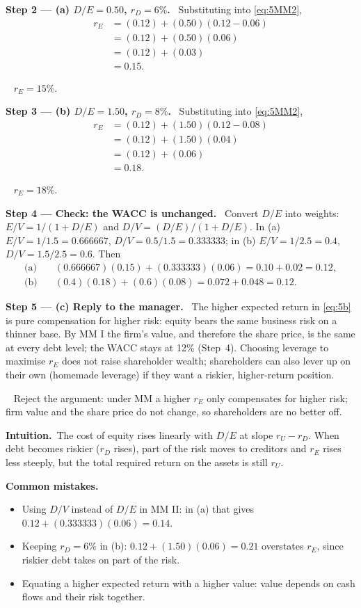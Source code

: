 \documentclass[11pt,a4paper]{article}
\numberwithin{equation}{section}
\newcommand{\step}[2]{\par\smallskip\noindent\textbf{Step #1 --- #2.}~}
\newcommand{\intuition}{\par\smallskip\noindent\textbf{Intuition.}~}
\newcommand{\answer}[1]{\par\smallskip\noindent\fbox{\textbf{Answer #1.}}~}
\newcommand{\pitfalls}{\par\medskip\noindent\textbf{Common mistakes.}}
\begin{document}
\step{2}{(a) $D/E=0.50$, $r_D=6\%$} Substituting into \eqref{eq:5MM2},
\begin{align}
  r_E &= (0.12)+(0.50)(0.12-0.06) \nonumber\\
      &= (0.12)+(0.50)(0.06) \nonumber\\
      &= (0.12)+(0.03) \nonumber\\
      &= 0.15. \label{eq:5a}
\end{align}
\answer{(a)} $r_E=15\%$.

\step{3}{(b) $D/E=1.50$, $r_D=8\%$} Substituting into \eqref{eq:5MM2},
\begin{align}
  r_E &= (0.12)+(1.50)(0.12-0.08) \nonumber\\
      &= (0.12)+(1.50)(0.04) \nonumber\\
      &= (0.12)+(0.06) \nonumber\\
      &= 0.18. \label{eq:5b}
\end{align}
\answer{(b)} $r_E=18\%$.

\step{4}{Check: the WACC is unchanged} Convert $D/E$ into weights: $E/V=1/(1+D/E)$ and
$D/V=(D/E)/(1+D/E)$. In (a) $E/V=1/1.5=0.666667$, $D/V=0.5/1.5=0.333333$; in (b)
$E/V=1/2.5=0.4$, $D/V=1.5/2.5=0.6$. Then
\begin{align}
  \text{(a)}\quad & (0.666667)(0.15)+(0.333333)(0.06)=0.10+0.02=0.12, \nonumber\\
  \text{(b)}\quad & (0.4)(0.18)+(0.6)(0.08)=0.072+0.048=0.12. \nonumber
\end{align}

\step{5}{(c) Reply to the manager} The higher expected return in \eqref{eq:5b} is pure
compensation for higher risk: equity bears the same business risk on a thinner base. By MM I the
firm's value, and therefore the share price, is the same at every debt level; the WACC stays at
12\% (Step~4). Choosing leverage to maximise $r_E$ does not raise shareholder wealth;
shareholders can also lever up on their own (homemade leverage) if they want a riskier,
higher-return position.
\answer{(c)} Reject the argument: under MM a higher $r_E$ only compensates for higher risk;
firm value and the share price do not change, so shareholders are no better off.

\intuition The cost of equity rises linearly with $D/E$ at slope $r_U-r_D$. When debt becomes
riskier ($r_D$ rises), part of the risk moves to creditors and $r_E$ rises less steeply, but the
total required return on the assets is still $r_U$.

\pitfalls
\begin{itemize}
  \item Using $D/V$ instead of $D/E$ in MM II: in (a) that gives $0.12+(0.333333)(0.06)=0.14$.
  \item Keeping $r_D=6\%$ in (b): $0.12+(1.50)(0.06)=0.21$ overstates $r_E$, since riskier
        debt takes on part of the risk.
  \item Equating a higher expected return with a higher value: value depends on cash flows and
        their risk together.
\end{itemize}
\end{document}
